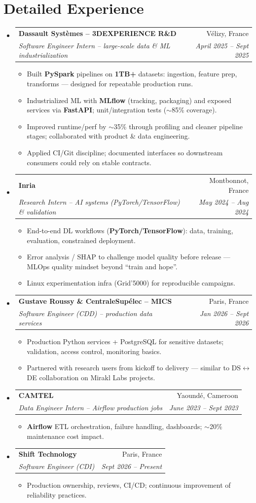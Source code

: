 \documentclass[letterpaper,10.5pt]{article}
\makeatletter
\newcommand{\resumeItem}[1]{\item\small{#1}}
\newcommand{\resumeSubheading}[4]{\vspace{4pt}\item\begin{tabular*}{0.97\textwidth}[t]{l@{\extracolsep{\fill}}r}\textbf{#1}&{#2}\\\textit{\small #3}&\textit{\small #4}\\\end{tabular*}\vspace{2pt}}
\newcommand{\resumeSubHeadingListStart}{\begin{itemize}[leftmargin=0.08in,label={}]}
\newcommand{\resumeSubHeadingListEnd}{\end{itemize}}
\makeatother
\begin{document}
\section{Detailed Experience}
\resumeSubHeadingListStart
  \resumeSubheading
    {Dassault Syst\`emes -- 3DEXPERIENCE R\&D}{V\'elizy, France}
    {Software Engineer Intern -- large-scale data \& ML industrialization}{April 2025 -- Sept 2025}
    \begin{itemize}
      \resumeItem{Built \textbf{PySpark} pipelines on \textbf{1TB+} datasets: ingestion, feature prep, transforms --- designed for repeatable production runs.}
      \resumeItem{Industrialized ML with \textbf{MLflow} (tracking, packaging) and exposed services via \textbf{FastAPI}; unit/integration tests ($\sim$85\% coverage).}
      \resumeItem{Improved runtime/perf by $\sim$35\% through profiling and cleaner pipeline stages; collaborated with product \& data engineering.}
      \resumeItem{Applied CI/Git discipline; documented interfaces so downstream consumers could rely on stable contracts.}
    \end{itemize}
  \resumeSubheading
    {Inria}{Montbonnot, France}
    {Research Intern -- AI systems (PyTorch/TensorFlow) \& validation}{May 2024 -- Aug 2024}
    \begin{itemize}
      \resumeItem{End-to-end DL workflows (\textbf{PyTorch/TensorFlow}): data, training, evaluation, constrained deployment.}
      \resumeItem{Error analysis / SHAP to challenge model quality before release --- MLOps quality mindset beyond ``train and hope''.}
      \resumeItem{Linux experimentation infra (Grid'5000) for reproducible campaigns.}
    \end{itemize}
  \resumeSubheading
    {Gustave Roussy \& CentraleSup\'elec -- MICS}{Paris, France}
    {Software Engineer (CDD) -- production data services}{Jan 2026 -- Sept 2026}
    \begin{itemize}
      \resumeItem{Production Python services + PostgreSQL for sensitive datasets; validation, access control, monitoring basics.}
      \resumeItem{Partnered with research users from kickoff to delivery --- similar to DS$\leftrightarrow$DE collaboration on Mirakl Labs projects.}
    \end{itemize}
  \resumeSubheading
    {CAMTEL}{Yaound\'e, Cameroon}
    {Data Engineer Intern -- Airflow production jobs}{June 2023 -- Sept 2023}
    \begin{itemize}
      \resumeItem{\textbf{Airflow} ETL orchestration, failure handling, dashboards; $\sim$20\% maintenance cost impact.}
    \end{itemize}
  \resumeSubheading
    {Shift Technology}{Paris, France}
    {Software Engineer (CDI)}{Sept 2026 -- Present}
    \begin{itemize}
      \resumeItem{Production ownership, reviews, CI/CD; continuous improvement of reliability practices.}
    \end{itemize}
\resumeSubHeadingListEnd
\end{document}
